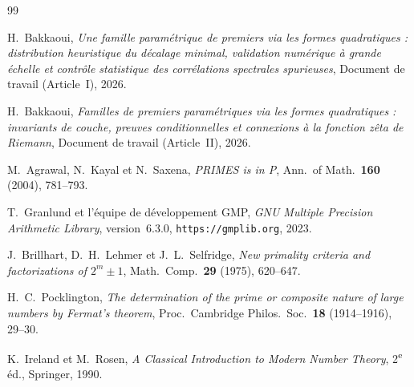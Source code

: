 \documentclass[11pt,a4paper]{article}
\theoremstyle{definition}
\theoremstyle{remark}
\begin{document}
\begin{thebibliography}{99}

H.~Bakkaoui, \emph{Une famille paramétrique de premiers via les formes
quadratiques : distribution heuristique du décalage minimal, validation
numérique à grande échelle et contrôle statistique des corrélations
spectrales spurieuses},
Document de travail (Article~I), 2026.

H.~Bakkaoui, \emph{Familles de premiers paramétriques via les formes
quadratiques : invariants de couche, preuves conditionnelles et connexions
à la fonction zêta de Riemann},
Document de travail (Article~II), 2026.

M.~Agrawal, N.~Kayal et N.~Saxena, \emph{PRIMES is in P},
Ann.\ of Math.\ \textbf{160} (2004), 781--793.

T.~Granlund et l'équipe de développement GMP,
\emph{GNU Multiple Precision Arithmetic Library}, version~6.3.0,
\texttt{https://gmplib.org}, 2023.

J.~Brillhart, D.~H.~Lehmer et J.~L.~Selfridge, \emph{New primality
criteria and factorizations of $2^m\pm 1$},
Math.\ Comp.\ \textbf{29} (1975), 620--647.

H.~C.~Pocklington, \emph{The determination of the prime or composite
nature of large numbers by Fermat's theorem},
Proc.\ Cambridge Philos.\ Soc.\ \textbf{18} (1914--1916), 29--30.

K.~Ireland et M.~Rosen, \emph{A Classical Introduction to Modern
Number Theory}, 2\textsuperscript{e} éd., Springer, 1990.

\end{thebibliography}
\end{document}
